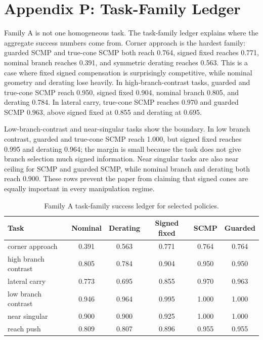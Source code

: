 \documentclass{article}
\begin{document}
\section{Appendix P: Task-Family Ledger}

Family A is not one homogeneous task. The task-family ledger explains where the aggregate success numbers come from. Corner approach is the hardest family: guarded SCMP and true-cone SCMP both reach 0.764, signed fixed reaches 0.771, nominal branch reaches 0.391, and symmetric derating reaches 0.563. This is a case where fixed signed compensation is surprisingly competitive, while nominal geometry and derating lose heavily. In high-branch-contrast tasks, guarded and true-cone SCMP reach 0.950, signed fixed 0.904, nominal branch 0.805, and derating 0.784. In lateral carry, true-cone SCMP reaches 0.970 and guarded SCMP 0.963, above signed fixed at 0.855 and derating at 0.695.

Low-branch-contrast and near-singular tasks show the boundary. In low branch contrast, guarded and true-cone SCMP reach 1.000, but signed fixed reaches 0.995 and derating 0.964; the margin is small because the task does not give branch selection much signed information. Near singular tasks are also near ceiling for SCMP and guarded SCMP, while nominal branch and derating both reach 0.900. These rows prevent the paper from claiming that signed cones are equally important in every manipulation regime.

\begin{table}[t]
\centering
\footnotesize
\caption{Family A task-family success ledger for selected policies.}
\label{tab:task-ledger}
\begin{tabular}{lccccc}
\toprule
Task & Nominal & Derating & Signed fixed & SCMP & Guarded \\
\midrule
corner approach & 0.391 & 0.563 & 0.771 & 0.764 & 0.764 \\
high branch contrast & 0.805 & 0.784 & 0.904 & 0.950 & 0.950 \\
lateral carry & 0.773 & 0.695 & 0.855 & 0.970 & 0.963 \\
low branch contrast & 0.946 & 0.964 & 0.995 & 1.000 & 1.000 \\
near singular & 0.900 & 0.900 & 0.925 & 1.000 & 1.000 \\
reach push & 0.809 & 0.807 & 0.896 & 0.955 & 0.955 \\
\bottomrule
\end{tabular}
\end{table}
\end{document}

